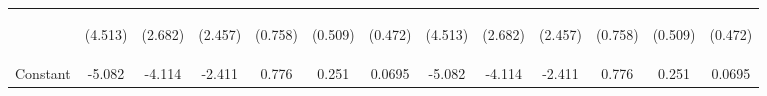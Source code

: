 \documentclass[]{article}
\begin{document}
\begin{center}
\begin{tabular}{lcccccccccccc}
\vspace{4pt} & \begin{footnotesize}(4.513)\end{footnotesize} & \begin{footnotesize}(2.682)\end{footnotesize} & \begin{footnotesize}(2.457)\end{footnotesize} & \begin{footnotesize}(0.758)\end{footnotesize} & \begin{footnotesize}(0.509)\end{footnotesize} & \begin{footnotesize}(0.472)\end{footnotesize} & \begin{footnotesize}(4.513)\end{footnotesize} & \begin{footnotesize}(2.682)\end{footnotesize} & \begin{footnotesize}(2.457)\end{footnotesize} & \begin{footnotesize}(0.758)\end{footnotesize} & \begin{footnotesize}(0.509)\end{footnotesize} & \begin{footnotesize}(0.472)\end{footnotesize} \\
Constant & -5.082 & -4.114 & -2.411 & 0.776 & 0.251 & 0.0695 & -5.082 & -4.114 & -2.411 & 0.776 & 0.251 & 0.0695 \\

\end{tabular}
\end{center}
\end{document}
